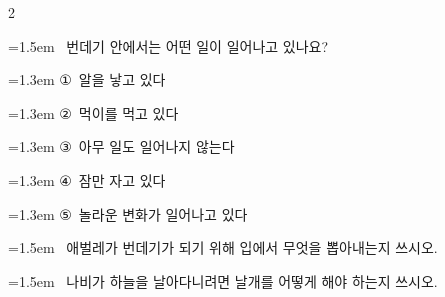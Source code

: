 \documentclass[12pt, a4paper]{article}
\begin{document}
\begin{multicols}{2}
\begin{minipage}{\columnwidth}
\vspace{4mm}
\end{minipage}
\par

\noindent\begin{minipage}{\columnwidth}
\vspace{2mm}
{\hangindent=1.5em  ~번데기 안에서는 어떤 일이 일어나고 있나요?\par}

\vspace{0.5mm}
{\hangindent=1.3em  \noindent\hspace{0.3em}①~알을 낳고 있다\par}
{\hangindent=1.3em  \noindent\hspace{0.3em}②~먹이를 먹고 있다\par}
{\hangindent=1.3em  \noindent\hspace{0.3em}③~아무 일도 일어나지 않는다\par}
{\hangindent=1.3em  \noindent\hspace{0.3em}④~잠만 자고 있다\par}
{\hangindent=1.3em  \noindent\hspace{0.3em}⑤~놀라운 변화가 일어나고 있다\par}
\vspace{4mm}
\end{minipage}
\par

\noindent\begin{minipage}{\columnwidth}
\vspace{2mm}
{\hangindent=1.5em  ~애벌레가 번데기가 되기 위해 입에서 무엇을 뽑아내는지 쓰시오.\par}

\vspace{3mm}
\noindent\hrulefill
\vspace{2.5mm}
\noindent\hrulefill
\vspace{2.5mm}
\noindent\hrulefill
\vspace{2.5mm}
\noindent\hrulefill
\vspace{2.5mm}
\noindent\hrulefill
\vspace{2.5mm}
\vspace{1mm}
\vspace{4mm}
\end{minipage}
\par

\noindent\begin{minipage}{\columnwidth}
\vspace{2mm}
{\hangindent=1.5em  ~나비가 하늘을 날아다니려면 날개를 어떻게 해야 하는지 쓰시오.\par}


\end{minipage}
\end{multicols}
\end{document}
